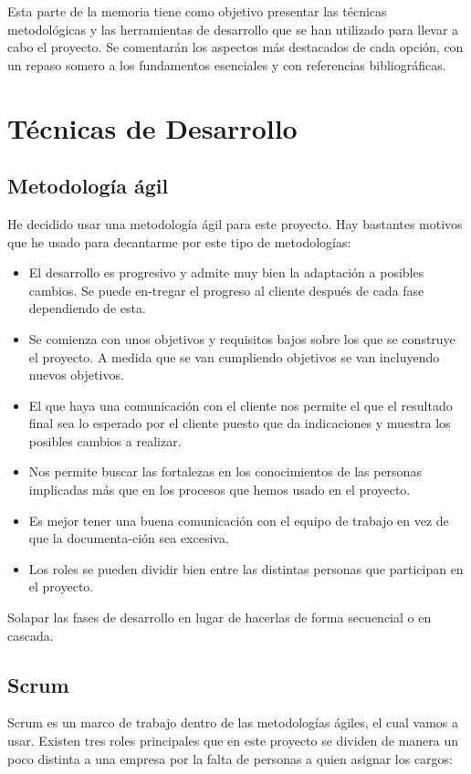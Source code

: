 
Esta parte de la memoria tiene como objetivo presentar las técnicas metodológicas y las herramientas de desarrollo que se han utilizado para llevar a cabo el proyecto. 
Se comentarán los aspectos más destacados de cada opción, con un repaso somero a los fundamentos esenciales y con referencias bibliográficas.

\section{Técnicas de Desarrollo}
\subsection{Metodología ágil}
He decidido usar una metodología ágil para este proyecto. Hay bastantes motivos que he usado para decantarme por este tipo de metodologías:
\begin{itemize}
    \item El desarrollo es progresivo y admite muy bien la adaptación a posibles cambios. Se puede en-tregar el progreso al cliente después de cada fase dependiendo de esta.
    \item Se comienza con unos objetivos y requisitos bajos sobre los que se construye el proyecto. A medida que se van cumpliendo objetivos se van incluyendo nuevos objetivos.
    \item El que haya una comunicación con el cliente nos permite el que el resultado final sea lo esperado por el cliente puesto que da indicaciones y muestra los posibles cambios a realizar.
    \item Nos permite buscar las fortalezas en los conocimientos de las personas implicadas más que en los procesos que hemos usado en el proyecto.
    \item Es mejor tener una buena comunicación con el equipo de trabajo en vez de que la documenta-ción sea excesiva.
    \item Los roles se pueden dividir bien entre las distintas personas que participan en el proyecto.
\end{itemize}

Solapar las fases de desarrollo en lugar de hacerlas de forma secuencial
o en cascada. 

\subsection{Scrum}
Scrum es un marco de trabajo dentro de las metodologías ágiles, el cual vamos a usar. \cite{wiki:scrum}
Existen tres roles principales que en este proyecto se dividen de manera un poco distinta a una empresa por la falta de personas a quien asignar los cargos:

